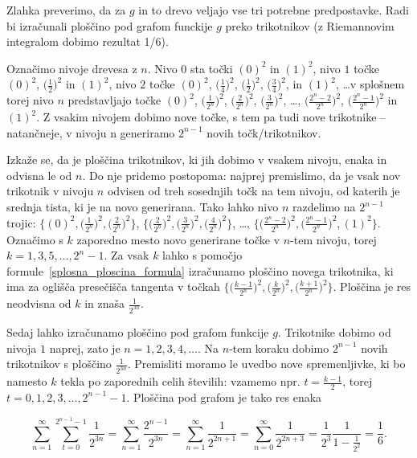 \documentclass[a4paper, 12pt, titlepage]{article}
\begin{document}
Zlahka preverimo, da za $ g $ in to drevo veljajo vse tri potrebne predpostavke. Radi bi izračunali ploščino pod grafom funckije $ g $ preko trikotnikov (z Riemannovim integralom dobimo rezultat 1/6).

Označimo nivoje drevesa z $ n $. Nivo $ 0 $ sta točki $ (0)^2 $ in $ (1)^2 $, nivo $ 1 $ točke $ (0)^2 $, $ \bigl(\frac{1}{2}\bigr)^2 $ in $ (1)^2 $, nivo $ 2 $ točke $ (0)^2 $, $ \bigl(\frac{1}{4}\bigr)^2 $, $ \bigl(\frac{1}{2}\bigr)^2 $, $ \bigl(\frac{3}{4}\bigr)^2 $, in $ (1)^2 $, \ldots v splošnem torej nivo $ n $ predstavljajo točke $ (0)^2 $, $ \bigl(\frac{1}{2^n}\bigr)^2 $, $ \bigl(\frac{2}{2^n}\bigr)^2 $, $ \bigl(\frac{3}{2^n}\bigr)^2 $, \ldots, $ \bigl(\frac{2^n-2}{2^n}\bigr)^2 $, $ \bigl(\frac{2^n-1}{2^n}\bigr)^2 $ in $ (1)^2 $. Z vsakim nivojem dobimo nove točke, s tem pa tudi nove trikotnike -- natančneje, v nivoju n generiramo $ 2^{n-1} $ novih točk/trikotnikov.

Izkaže se, da je ploščina trikotnikov, ki jih dobimo v vsakem nivoju, enaka in odvisna le od $ n $. Do nje pridemo postopoma: najprej premislimo, da je vsak nov trikotnik v nivoju $ n $ odvisen od treh sosednjih točk na tem nivoju, od katerih je srednja tista, ki je na novo generirana. Tako lahko nivo $ n $ razdelimo na $ 2^{n-1} $ trojic: $ \{(0)^2, \bigl(\frac{1}{2^n}\bigr)^2,\bigl(\frac{2}{2^n}\bigr)^2\} $, $ \{\bigl(\frac{2}{2^n}\bigr)^2, \bigl(\frac{3}{2^n}\bigr)^2, \bigl(\frac{4}{2^n}\bigr)^2\} $, \ldots, $ \{\bigl(\frac{2^n-2}{2^n}\bigr)^2, \bigl(\frac{2^n-1}{2^n}\bigr)^2, (1)^2\}$. Označimo s $ k $ zaporedno mesto novo generirane točke v $ n $-tem nivoju, torej $ k = 1, 3, 5, \ldots, 2^n-1 $. Za vsak $ k $ lahko s pomočjo formule~\ref{splosna_ploscina_formula} izračunamo ploščino novega trikotnika, ki ima za oglišča presečišča tangenta v točkah $ \{\bigl(\frac{k-1}{2^n}\bigr)^2, \bigl(\frac{k}{2^n}\bigr)^2, \bigl(\frac{k+1}{2^n}\bigr)^2\} $. Ploščina je res neodvisna od $ k $ in znaša $ \frac{1}{2^{3n}} $.

Sedaj lahko izračunamo ploščino pod grafom funkcije $ g $. Trikotnike dobimo od nivoja $ 1 $ naprej, zato je $ n = 1, 2, 3, 4, \ldots $. Na $ n $-tem koraku dobimo $ 2^{n-1} $ novih trikotnikov s ploščino $ \frac{1}{2^{3n}} $. Premisliti moramo le uvedbo nove spremenljivke, ki bo namesto $ k $ tekla po zaporednih celih številih: vzamemo npr. $ t = \frac{k-1}{2} $, torej $ t = 0, 1, 2, 3, \ldots, 2^{n-1}-1 $. Ploščina pod grafom je tako res enaka

\begin{equation*}
    \sum_{n=1}^{\infty} \sum_{t=0}^{2^{n-1}-1} \frac{1}{2^{3n}} = \sum_{n=1}^{\infty} \frac{2^{n-1}}{2^{3n}} = \sum_{n=1}^{\infty} \frac{1}{2^{2n+1}} = \sum_{n=0}^{\infty} \frac{1}{2^{2n+3}} = \frac{1}{2^3} \frac{1}{1-\frac{1}{2^2}} = \frac{1}{6}\text{.}
\end{equation*}
\end{document}
